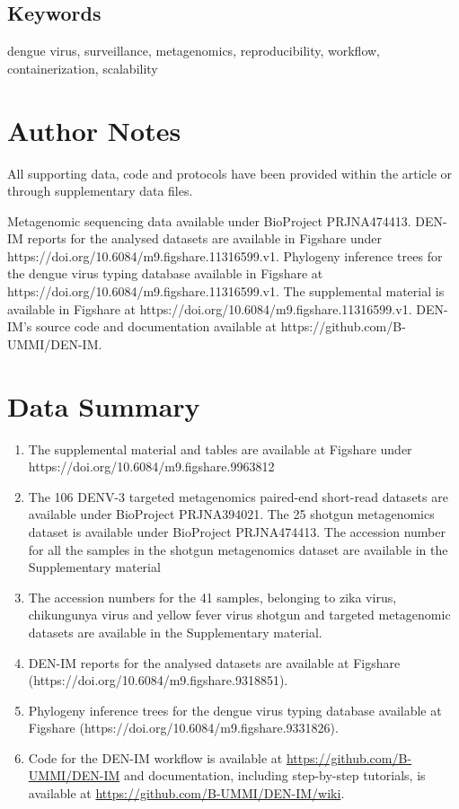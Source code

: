 \subsection{Keywords}
dengue virus, surveillance, metagenomics, reproducibility, workflow, containerization, scalability
 
\section{Author Notes}
All supporting data, code and protocols have been provided within the article or through supplementary data files.

Metagenomic sequencing data available under BioProject PRJNA474413. DEN-IM reports for the analysed datasets are available in Figshare under https://doi.org/10.6084/m9.figshare.11316599.v1. Phylogeny inference trees for the dengue virus typing database available in Figshare at https://doi.org/10.6084/m9.figshare.11316599.v1. The supplemental material is available in Figshare at https://doi.org/10.6084/m9.figshare.11316599.v1. DEN-IM’s source code and documentation available at https://github.com/B-UMMI/DEN-IM.

 

\section{Data Summary}

\begin{enumerate}
    \item The supplemental material and tables are available at Figshare under https://doi.org/10.6084/m9.figshare.9963812
    \item The 106 DENV-3 targeted metagenomics paired-end short-read datasets are available under BioProject PRJNA394021. The 25 shotgun metagenomics dataset is available under BioProject PRJNA474413. The accession number for all the samples in the shotgun metagenomics dataset are available in the Supplementary material
    \item The accession numbers for the 41 samples, belonging to zika virus, chikungunya virus and yellow fever virus shotgun and targeted metagenomic datasets are available in the Supplementary material. 
    \item DEN-IM reports for the analysed datasets are available at Figshare  (https://doi.org/10.6084/m9.figshare.9318851).
    \item Phylogeny inference trees for the dengue virus typing database available at Figshare (https://doi.org/10.6084/m9.figshare.9331826).
    \item Code for the DEN-IM workflow is available at \url{https://github.com/B-UMMI/DEN-IM} and documentation, including step-by-step tutorials, is available at \url{https://github.com/B-UMMI/DEN-IM/wiki}.
\end{enumerate}

